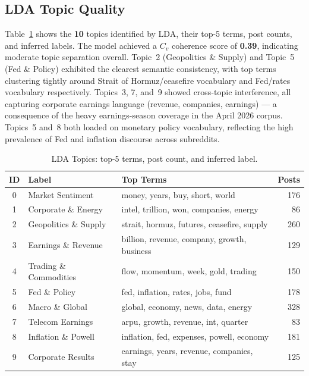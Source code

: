 \documentclass[sigconf]{acmart}
\begin{document}
\subsection{LDA Topic Quality}

Table~\ref{tab:topics} shows the \textbf{10} topics identified by LDA, their top-5 terms, post counts, and inferred labels. The model achieved a $C_v$ coherence score of \textbf{0.39}, indicating moderate topic separation overall. Topic~2 (Geopolitics \& Supply) and Topic~5 (Fed \& Policy) exhibited the clearest semantic consistency, with top terms clustering tightly around Strait of Hormuz/ceasefire vocabulary and Fed/rates vocabulary respectively. Topics~3, 7, and~9 showed cross-topic interference, all capturing corporate earnings language (revenue, companies, earnings) --- a consequence of the heavy earnings-season coverage in the April 2026 corpus. Topics~5 and~8 both loaded on monetary policy vocabulary, reflecting the high prevalence of Fed and inflation discourse across subreddits.

\begin{table}[h]
\caption{LDA Topics: top-5 terms, post count, and inferred label.}
\label{tab:topics}
\begin{tabular}{clp{3.8cm}r}
\toprule
\textbf{ID} & \textbf{Label} & \textbf{Top Terms} & \textbf{Posts} \\
\midrule
0 & Market Sentiment      & money, years, buy, short, world          & 176 \\
1 & Corporate \& Energy   & intel, trillion, won, companies, energy  &  86 \\
2 & Geopolitics \& Supply & strait, hormuz, futures, ceasefire, supply & 260 \\
3 & Earnings \& Revenue   & billion, revenue, company, growth, business & 129 \\
4 & Trading \& Commodities & flow, momentum, week, gold, trading     & 150 \\
5 & Fed \& Policy         & fed, inflation, rates, jobs, fund        & 178 \\
6 & Macro \& Global       & global, economy, news, data, energy      & 328 \\
7 & Telecom Earnings      & arpu, growth, revenue, int, quarter      &  83 \\
8 & Inflation \& Powell   & inflation, fed, expenses, powell, economy & 181 \\
9 & Corporate Results     & earnings, years, revenue, companies, stay & 125 \\
\bottomrule
\end{tabular}
\end{table}
\end{document}
